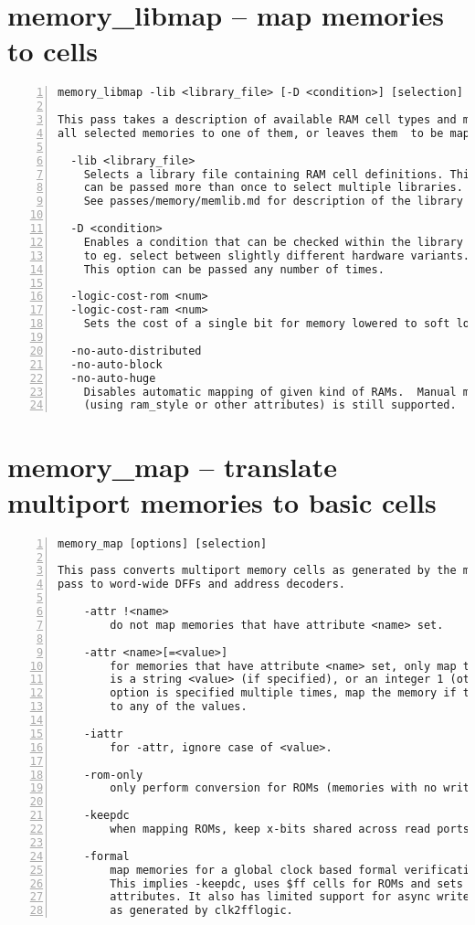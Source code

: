 \section{memory\_libmap -- map memories to cells}
\label{cmd:memory_libmap}
\begin{lstlisting}[numbers=left,frame=single]
    memory_libmap -lib <library_file> [-D <condition>] [selection]

This pass takes a description of available RAM cell types and maps
all selected memories to one of them, or leaves them  to be mapped to FFs.

  -lib <library_file>
    Selects a library file containing RAM cell definitions. This option
    can be passed more than once to select multiple libraries.
    See passes/memory/memlib.md for description of the library format.

  -D <condition>
    Enables a condition that can be checked within the library file
    to eg. select between slightly different hardware variants.
    This option can be passed any number of times.

  -logic-cost-rom <num>
  -logic-cost-ram <num>
    Sets the cost of a single bit for memory lowered to soft logic.

  -no-auto-distributed
  -no-auto-block
  -no-auto-huge
    Disables automatic mapping of given kind of RAMs.  Manual mapping
    (using ram_style or other attributes) is still supported.
\end{lstlisting}

\section{memory\_map -- translate multiport memories to basic cells}
\label{cmd:memory_map}
\begin{lstlisting}[numbers=left,frame=single]
    memory_map [options] [selection]

This pass converts multiport memory cells as generated by the memory_collect
pass to word-wide DFFs and address decoders.

    -attr !<name>
        do not map memories that have attribute <name> set.

    -attr <name>[=<value>]
        for memories that have attribute <name> set, only map them if its value
        is a string <value> (if specified), or an integer 1 (otherwise). if this
        option is specified multiple times, map the memory if the attribute is
        to any of the values.

    -iattr
        for -attr, ignore case of <value>.

    -rom-only
        only perform conversion for ROMs (memories with no write ports).

    -keepdc
        when mapping ROMs, keep x-bits shared across read ports.

    -formal
        map memories for a global clock based formal verification flow.
        This implies -keepdc, uses $ff cells for ROMs and sets hdlname
        attributes. It also has limited support for async write ports
        as generated by clk2fflogic.
\end{lstlisting}

